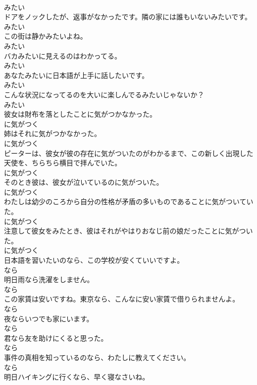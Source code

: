 \documentclass[8pt]{extreport}
\begin{document}
\begin{CJK}{UTF8}{min}
\\	みたい
\\	ドアをノックしたが、返事がなかったです。隣の家には誰もいないみたいです。	
\\	みたい
\\	この街は静かみたいよね。	
\\	みたい
\\	バカみたいに見えるのはわかってる。	
\\	みたい
\\	あなたみたいに日本語が上手に話したいです。	
\\	みたい
\\	こんな状況になってるのを大いに楽しんでるみたいじゃないか？	
\\	みたい
\\	彼女は財布を落としたことに気がつかなかった。	
\\	に気がつく
\\	姉はそれに気がつかなかった。	
\\	に気がつく
\\	ピーターは、彼女が彼の存在に気がついたのがわかるまで、この新しく出現した天使を、ちらちら横目で拝んでいた。	
\\	に気がつく
\\	そのとき彼は、彼女が泣いているのに気がついた。	
\\	に気がつく
\\	わたしは幼少のころから自分の性格が矛盾の多いものであることに気がついていた。	
\\	に気がつく
\\	注意して彼女をみたとき、彼はそれがやはりおなじ前の娘だったことに気がついた。	
\\	に気がつく
\\	日本語を習いたいのなら、この学校が安くていいですよ。	
\\	なら
\\	明日雨なら洗濯をしません。	
\\	なら
\\	この家賃は安いですね。東京なら、こんなに安い家賃で借りられませんよ。	
\\	なら
\\	夜ならいつでも家にいます。	
\\	なら
\\	君なら友を助けにくると思った。	
\\	なら
\\	事件の真相を知っているのなら、わたしに教えてください。	
\\	なら
\\	明日ハイキングに行くなら、早く寝なさいね。	

\end{CJK}
\end{document}
